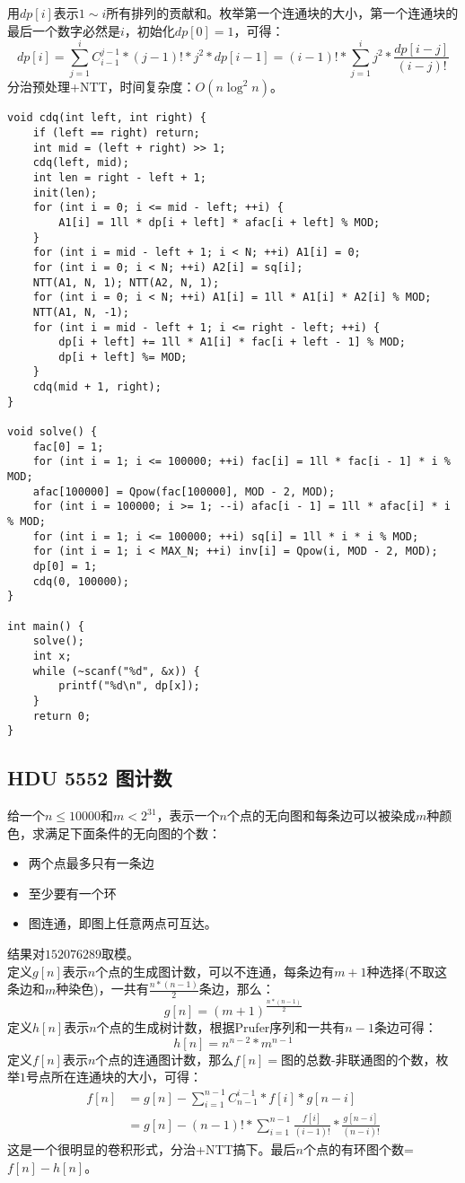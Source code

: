 用$dp[i]$表示$1\sim i$所有排列的贡献和。枚举第一个连通块的大小，第一个连通块的最后一个数字必然是$i$，初始化$dp[0]=1$，可得：
$$
dp[i]=\sum_{j=1}^{i}C_{i-1}^{j-1}*(j-1)!*j^{2}*dp[i-1]=(i-1)!*\sum_{j=1}^{i}j^2*\frac{dp[i-j]}{(i-j)!}
$$
分治预处理+NTT，时间复杂度：$O(n\log^2 n)$。
\begin{lstlisting}
void cdq(int left, int right) {
    if (left == right) return;
    int mid = (left + right) >> 1;
    cdq(left, mid);
    int len = right - left + 1;
    init(len);
    for (int i = 0; i <= mid - left; ++i) {
        A1[i] = 1ll * dp[i + left] * afac[i + left] % MOD;
    }
    for (int i = mid - left + 1; i < N; ++i) A1[i] = 0;
    for (int i = 0; i < N; ++i) A2[i] = sq[i];
    NTT(A1, N, 1); NTT(A2, N, 1);
    for (int i = 0; i < N; ++i) A1[i] = 1ll * A1[i] * A2[i] % MOD;
    NTT(A1, N, -1);
    for (int i = mid - left + 1; i <= right - left; ++i) {
        dp[i + left] += 1ll * A1[i] * fac[i + left - 1] % MOD;
        dp[i + left] %= MOD;
    }
    cdq(mid + 1, right);
}

void solve() {
    fac[0] = 1;
    for (int i = 1; i <= 100000; ++i) fac[i] = 1ll * fac[i - 1] * i % MOD;
    afac[100000] = Qpow(fac[100000], MOD - 2, MOD);
    for (int i = 100000; i >= 1; --i) afac[i - 1] = 1ll * afac[i] * i % MOD;
    for (int i = 1; i <= 100000; ++i) sq[i] = 1ll * i * i % MOD;
    for (int i = 1; i < MAX_N; ++i) inv[i] = Qpow(i, MOD - 2, MOD);
    dp[0] = 1;
    cdq(0, 100000);
}

int main() {
    solve();
    int x;
    while (~scanf("%d", &x)) {
        printf("%d\n", dp[x]);
    }
    return 0;
}
\end{lstlisting}
\subsection{HDU 5552 图计数}
给一个$n\leq 10000$和$m < 2^{31}$，表示一个$n$个点的无向图和每条边可以被染成$m$种颜色，求满足下面条件的无向图的个数：
\begin{itemize}
\item 两个点最多只有一条边
\item 至少要有一个环
\item 图连通，即图上任意两点可互达。
\end{itemize}
结果对$152076289$取模。 \\

定义$g[n]$表示$n$个点的生成图计数，可以不连通，每条边有$m+1$种选择(不取这条边和$m$种染色)，一共有$\frac{n*(n-1)}{2}$条边，那么：
$$
g[n]=(m+1)^{\frac{n*(n-1)}{2}}
$$
定义$h[n]$表示$n$个点的生成树计数，根据Prufer序列和一共有$n-1$条边可得：
$$
h[n]=n^{n-2}*m^{n-1}
$$
定义$f[n]$表示$n$个点的连通图计数，那么$f[n]=$图的总数-非联通图的个数，枚举$1$号点所在连通块的大小，可得：
$$
\begin{aligned}
f[n]&=g[n]-\sum_{i=1}^{n-1}C_{n-1}^{i-1}*f[i]*g[n-i]\\
&=g[n]-(n-1)!*\sum_{i=1}^{n-1}\frac{f[i]}{(i-1)!}*\frac{g[n-i]}{(n-i)!}
\end{aligned}
$$
这是一个很明显的卷积形式，分治+NTT搞下。最后$n$个点的有环图个数=$f[n]-h[n]$。\\

